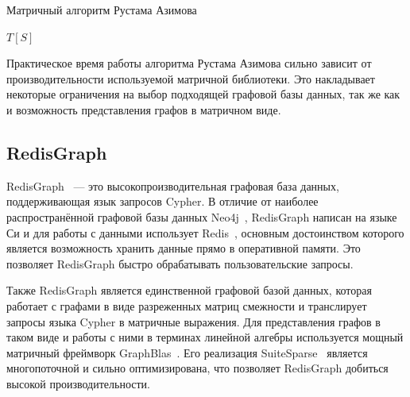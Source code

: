 \documentclass[14pt]{matmex-diploma-custom}
\begin{document}
\begin{algorithm}
\caption{Матричный алгоритм Рустама Азимова}

\begin{algorithmic}[1]
        \EndFor
    \EndFor    
        \EndFor
    \EndWhile
\State \Return $T[S]$
\EndFunction

\end{algorithmic}
\end{algorithm}

Практическое время работы алгоритма Рустама Азимова сильно зависит от производительности используемой матричной библиотеки. Это накладывает некоторые ограничения на выбор подходящей графовой базы данных, так же как и возможность представления графов в матричном виде.

\subsection{RedisGraph}
RedisGraph~\cite{redis-graph} --- это высокопроизводительная графовая база данных, поддерживающая язык запросов Cypher. В отличие от наиболее распространённой графовой базы данных Neo4j~\cite{neo4j}, RedisGraph написан на языке Си и для работы с данными использует Redis~\cite{redis}, основным достоинством которого является возможность хранить данные прямо в оперативной памяти. Это позволяет RedisGraph быстро обрабатывать пользовательские запросы.

Также RedisGraph является единственной графовой базой данных, которая работает с графами в виде разреженных матриц смежности и транслирует запросы языка Cypher в матричные выражения. Для представления графов в таком виде и работы с ними в терминах линейной алгебры используется мощный матричный фреймворк GraphBlas~\cite{graph-blas}. Его реализация SuiteSparse~\cite{suite-sparse} является многопоточной и сильно оптимизирована, что позволяет RedisGraph добиться высокой производительности.
\end{document}
